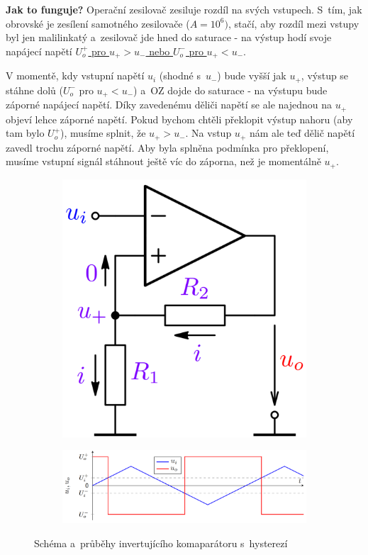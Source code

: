 \documentclass[a4paper,12pt]{article}   %
\begin{document}
\textbf{Jak to funguje?} Operační zesilovač zesiluje rozdíl na svých vstupech. S~tím, jak obrovské je zesílení samotného zesilovače ($A = 10^6)$, stačí, aby rozdíl mezi vstupy byl jen malilinkatý a~zesilovač jde hned do saturace - na výstup hodí svoje napájecí napětí \underline{$U_o^+$ pro $u_+ > u_-$ nebo $U_o^-$ pro $u_+ < u_-$}.

V momentě, kdy vstupní napětí $u_i$ (shodné s~$u_-$) bude vyšší jak $u_+$, výstup se stáhne dolů ($U_o^-$ pro $u_+ < u_-$) a~OZ dojde do saturace - na výstupu bude záporné napájecí napětí. Díky zavedenému děliči napětí se ale najednou na $u_+$ objeví lehce záporné napětí. Pokud bychom chtěli překlopit výstup nahoru (aby tam bylo $U_o^+$), musíme splnit, že $u_+ > u_-$. Na vstup $u_+$ nám ale teď dělič napětí zavedl trochu záporné napětí. Aby byla splněna podmínka pro překlopení, musíme vstupní signál stáhnout ještě víc do záporna, než je momentálně $u_+$.

\begin{figure}[h!]
    \centering
    \begin{subfigure}{.3\textwidth}
        \centering
        \includegraphics[width=\textwidth]{komparator-invert.PNG}
    \end{subfigure}
    \begin{subfigure}{.65\textwidth}
        \centering
        \includegraphics[width=\textwidth]{komparator-invert-graf.PNG}
    \end{subfigure}
    \caption{Schéma a~průběhy invertujícího komaparátoru s~hysterezí}
    \label{fig:invert:komp}
\end{figure}
\end{document}
